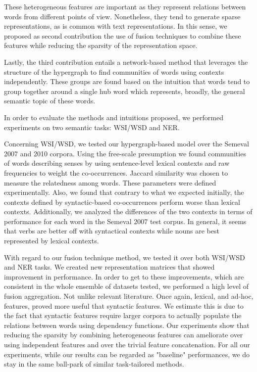 These heterogeneous features are important as they represent relations between words from different points of view. Nonetheless, they tend to generate sparse representations, as is common with text representations. In this sense, we proposed  as second contribution the use of fusion techniques to combine these features while reducing the sparsity of the representation space. 

Lastly, the third contribution entails a network-based method that leverages the structure of the hypergraph to find communities of words using contexts independently. These groups are found based on the intuition that words tend to group together around a single hub word which represents, broadly, the general semantic topic of these words.


In order to evaluate the methods and intuitions proposed, we performed experiments on two semantic tasks: WSI/WSD and NER.

Concerning WSI/WSD, we tested our hypergraph-based model over the Semeval 2007 and 2010 corpora. Using the free-scale presumption we found communities of words describing senses by using sentence-level lexical contexts and raw frequencies to weight the co-occurrences. Jaccard similarity was chosen to measure the relatedness among words. These parameters were defined experimentally. Also, we found that contrary to what we expected initially, the contexts defined by syntactic-based co-occurrences perform worse than lexical contexts. Additionally, we analyzed the differences of the two contexts in terms of performance for each word in the Semeval 2007 test corpus. In general, it seems that verbs are better off with syntactical contexts while nouns are best represented by lexical contexts.

With regard to our fusion technique method, we tested it over both WSI/WSD and NER tasks. We created new representation matrices that showed improvement in performance. In order to get to these improvements, which are consistent in the whole ensemble of datasets tested, we performed a high level of fusion aggregation. Not unlike relevant literature. Once again, lexical, and ad-hoc, features, proved more useful that syntactic features. We estimate this is due to the fact that syntactic features require larger corpora to actually populate the relations between words using dependency functions. Our experiments show that reducing the sparsity by combining heterogeneous features can ameliorate over using independent features and over the trivial feature concatenation. For all our experiments, while our results can be regarded as "baseline" performances, we do stay in the same ball-park of similar task-tailored methods.





